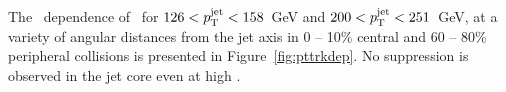 


The \pt\ dependence of \RDptr\ for \mbox{$126 < \mbox{$p_{\mathrm{T}}^{\mathrm{jet}}$} < 158$ GeV} and \mbox{$200 < \mbox{$p_{\mathrm{T}}^{\mathrm{jet}}$} < 251$ GeV}, at a variety of angular distances from the jet axis in 0 -- 10\% central and 60 -- 80\% peripheral collisions is presented in Figure~\ref{fig:pttrkdep}. No suppression is observed in the jet core even at high \pt. 


